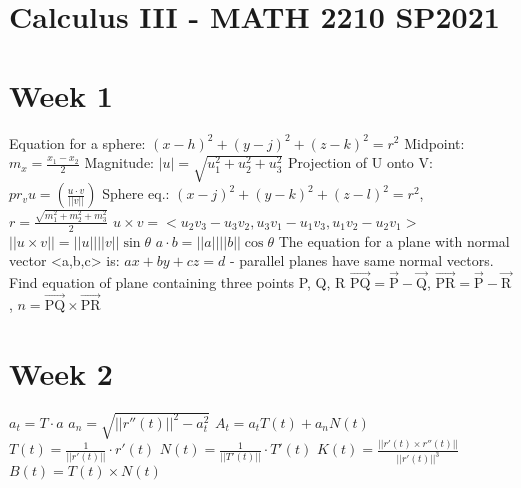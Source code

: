 \documentclass[12pt]{article}
\begin{document}
    \section*{Calculus III - MATH 2210 SP2021}
    \begin{paracol}{2}
        \section*{Week 1}
        Equation for a sphere: $(x-h)^2+(y-j)^2+(z-k)^2=r^2$
        Midpoint: $m_x=\frac{x_1-x_2}{2}$\newline
        Magnitude: $|u| = \sqrt{u_1^2 + u_2^2 + u_3^2}$ \newline
        Projection of U onto V: \newline
        $pr_{v}u=( \frac{u \cdot v}{||v||} )$
        Sphere eq.: $(x-j)^2 +(y-k)^2 + (z-l)^2 = r^2$, $r=\frac{\sqrt{m_1^2 + m_2^2 + m_3^2}}{2}$ \newline
        $u \times v = <u_2 v_3 - u_3 v_2, u_3 v_1 - u_1 v_3 , u_1 v_2 - u_2 v_1 >$ \newline
        $||u \times v|| = ||u||||v||\sin \theta$
        $a \cdot b = ||a||||b|| \cos \theta$ \newline
        The equation for a plane with normal vector <a,b,c> is: \newline
        $ax+by+cz=d$ - parallel planes have same normal vectors. \newline
        Find equation of plane containing three points P, Q, R \newline
        $\overrightarrow{\text{PQ}} = \overrightarrow{\text{P}} - \overrightarrow{\text{Q}}$,
        $\overrightarrow{\text{PR}} = \overrightarrow{\text{P}} - \overrightarrow{\text{R}}$, $n = \overrightarrow{\text{PQ}} \times \overrightarrow{\text{PR}}$

        \section*{Week 2}
        $a_t = T \cdot a$ \newline
        $a_n = \sqrt{||r''(t)||^2 - a_t^2}$ \newline
        $A_t = a_t T(t) + a_n N(t)$ \newline
        $T(t) = \frac{1}{||r'(t)||} \cdot r'(t)$ \newline
        $N(t) = \frac{1}{||T'(t)||} \cdot T'(t)$ \newline
        $K(t) = \frac{||r'(t) \times r''(t)||}{||r'(t)||^3}$ \newline
        $B(t) = T(t) \times N(t)$ \newline



\end{paracol}
\end{document}
